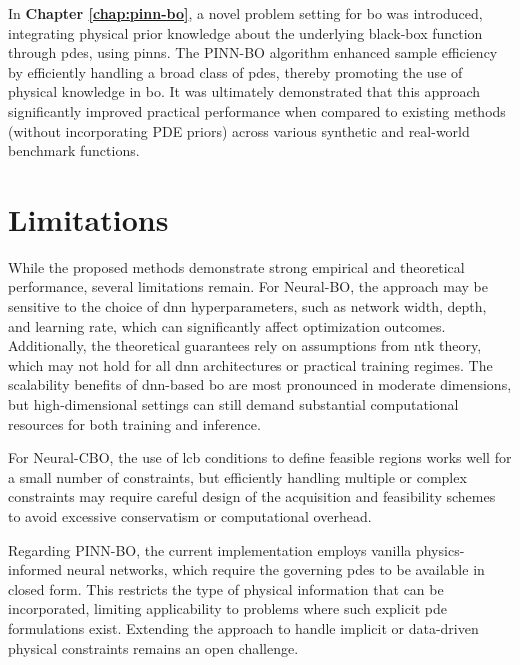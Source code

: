 In \textbf{Chapter \ref{chap:pinn-bo}}, a novel problem setting for \ac{bo} was introduced, integrating physical prior knowledge about the underlying black-box function through \acp{pde}, using \acp{pinn}. The PINN-BO algorithm enhanced sample efficiency by efficiently handling a broad class of \acp{pde}, thereby promoting the use of physical knowledge in \ac{bo}. It was ultimately demonstrated that this approach significantly improved practical performance when compared to existing methods (without incorporating PDE priors) across various synthetic and real-world benchmark functions.
\section{Limitations}
While the proposed methods demonstrate strong empirical and theoretical performance, several limitations remain. For Neural-BO, the approach may be sensitive to the choice of \ac{dnn} hyperparameters, such as network width, depth, and learning rate, which can significantly affect optimization outcomes. Additionally, the theoretical guarantees rely on assumptions from \ac{ntk} theory, which may not hold for all \acf{dnn} architectures or practical training regimes. The scalability benefits of \ac{dnn}-based \ac{bo} are most pronounced in moderate dimensions, but high-dimensional settings can still demand substantial computational resources for both training and inference.

For Neural-CBO, the use of \ac{lcb} conditions to define feasible regions works well for a small number of constraints, but efficiently handling multiple or complex constraints may require careful design of the acquisition and feasibility schemes to avoid excessive conservatism or computational overhead.

Regarding PINN-BO, the current implementation employs vanilla physics-informed neural networks, which require the governing \acp{pde} to be available in closed form. This restricts the type of physical information that can be incorporated, limiting applicability to problems where such explicit \ac{pde} formulations exist. Extending the approach to handle implicit or data-driven physical constraints remains an open challenge.
